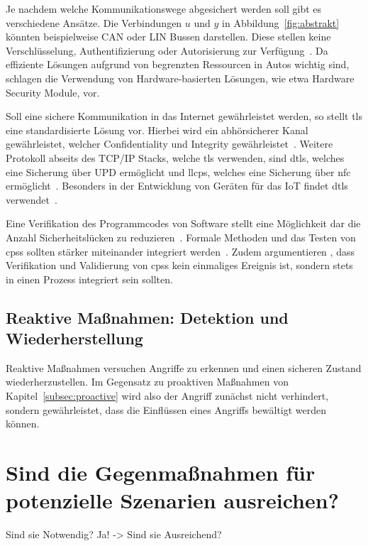 \documentclass[final,bibliography=totocnumbered]{include/sikseminar}
\newcommand{\cps}{\glspl{cps}\xspace}
\begin{document}
Je nachdem welche Kommunikationswege abgesichert werden soll gibt es verschiedene Ansätze.
Die Verbindungen $u$ und $y$ in Abbildung~\ref{fig:abstrakt} könnten beispielweise CAN oder LIN Bussen darstellen.
Diese stellen keine Verschlüsselung, Authentifizierung oder Autorisierung zur Verfügung~\cite{HLL+17}.
Da effiziente Lösungen aufgrund von begrenzten Ressourcen in Autos wichtig sind, schlagen \citeauthor{HLL 167,41} die Verwendung von Hardware-basierten Lösungen, wie etwa Hardware Security Module, vor.


Soll eine sichere Kommunikation in das Internet gewährleistet werden, so stellt \gls{tls} eine standardisierte Lösung vor.
Hierbei wird ein abhörsicherer Kanal gewährleistet, welcher Confidentiality und Integrity gewährleistet~\cite{SPB+16}.
Weitere Protokoll abseits des TCP/IP Stacks, welche \gls{tls} verwenden, sind \gls{dtls}, welches eine Sicherung über UPD ermöglicht und \gls{llcps}, welches eine Sicherung über \gls{nfc} ermöglicht~\cite{SPB+16}.
Besonders in der Entwicklung von Geräten für das IoT findet \gls{dtls} verwendet~\cite{YWY+17,FPA+18}.


Eine Verifikation des Programmcodes von Software stellt eine Möglichkeit dar die Anzahl Sicherheitslücken zu reduzieren~\cite{CAS08}.
Formale Methoden und das Testen von \cps sollten stärker miteinander integriert werden~\cite{RLS+10}.
Zudem argumentieren \citeauthor{SGL+08}, dass Verifikation und Validierung von \cps kein einmaliges Ereignis ist, sondern stets in einen Prozess integriert sein sollten.





\subsection{Reaktive Maßnahmen: Detektion und Wiederherstellung}\label{subsec:reactive}

Reaktive Maßnahmen versuchen Angriffe zu erkennen und einen sicheren Zustand wiederherzustellen.
Im Gegensatz zu proaktiven Maßnahmen von Kapitel~\ref{subsec:proactive} wird also der Angriff zunächst nicht verhindert, sondern gewährleistet, dass die Einflüssen eines Angriffs bewältigt werden können.


\section{Sind die Gegenmaßnahmen für potenzielle Szenarien ausreichen?}\label{sec:diskussion}

Sind sie Notwendig?
Ja! -> Sind sie Ausreichend?


\newpage

\printbibliography
\newpage
\end{document}
